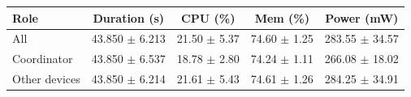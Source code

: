 \begin{tabular}{lcccc}
\hline
\textbf{Role} & \textbf{Duration (s)} & \textbf{CPU (\%)} & \textbf{Mem (\%)} & \textbf{Power (mW)} \\
\hline
All & 43.850 $\pm$ 6.213 & 21.50 $\pm$ 5.37 & 74.60 $\pm$ 1.25 & 283.55 $\pm$ 34.57 \\
Coordinator & 43.850 $\pm$ 6.537 & 18.78 $\pm$ 2.80 & 74.24 $\pm$ 1.11 & 266.08 $\pm$ 18.02 \\
Other devices & 43.850 $\pm$ 6.214 & 21.61 $\pm$ 5.43 & 74.61 $\pm$ 1.26 & 284.25 $\pm$ 34.91 \\
\hline
\end{tabular}
